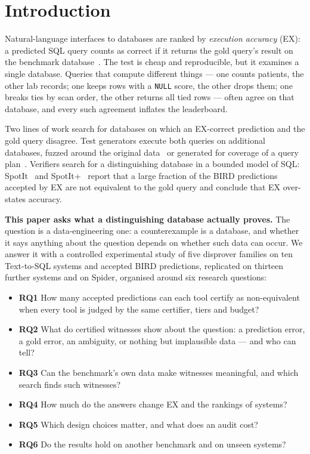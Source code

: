 \section{Introduction}\label{sec:intro}


Natural-language interfaces to databases are ranked by \emph{execution accuracy} (EX): a predicted SQL query counts as correct if it returns the gold query's result on the benchmark database~\cite{yu2018spider,li2023bird}. The test is cheap and reproducible, but it examines a single database. Queries that compute different things --- one counts patients, the other lab records; one keeps rows with a \texttt{NULL} score, the other drops them; one breaks ties by scan order, the other returns all tied rows --- often agree on that database, and every such agreement inflates the leaderboard.

Two lines of work search for databases on which an EX-correct prediction and the gold query disagree. Test generators execute both queries on additional databases, fuzzed around the original data~\cite{zhong2020testsuite} or generated for coverage of a query plan~\cite{chen2025parseval}. Verifiers search for a distinguishing database in a bounded model of SQL: SpotIt~\cite{klopfenstein2026spotit} and SpotIt+~\cite{tremante2026spotitplus} report that a large fraction of the BIRD predictions accepted by EX are not equivalent to the gold query and conclude that EX over-states accuracy.

\textbf{This paper asks what a distinguishing database actually proves.} The question is a data-engineering one: a counterexample is a database, and whether it says anything about the question depends on whether such data can occur. We answer it with a controlled experimental study of five disprover families on ten Text-to-SQL systems and  accepted BIRD predictions, replicated on thirteen further systems and on Spider, organised around six research questions:
\begin{itemize}
\item \textbf{RQ1} How many accepted predictions can each tool certify as non-equivalent when every tool is judged by the same certifier, tiers and budget?
\item \textbf{RQ2} What do certified witnesses show about the question: a prediction error, a gold error, an ambiguity, or nothing but implausible data --- and who can tell?
\item \textbf{RQ3} Can the benchmark's own data make witnesses meaningful, and which search finds such witnesses?
\item \textbf{RQ4} How much do the answers change EX and the rankings of systems?
\item \textbf{RQ5} Which design choices matter, and what does an audit cost?
\item \textbf{RQ6} Do the results hold on another benchmark and on unseen systems?
\end{itemize}

